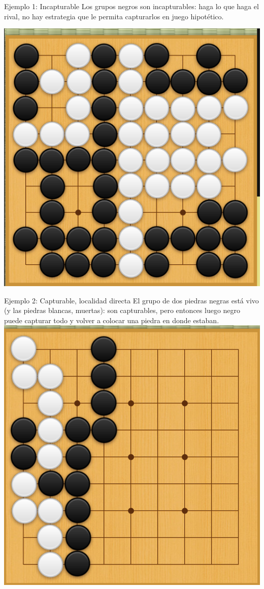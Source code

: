 \documentclass{beamer}
\begin{document}
\begin{frame}{Ejemplo 1: Incapturable}
    Los grupos negros son incapturables: haga lo que haga el rival, no hay estrategia que le permita capturarlos en juego hipotético.
    
    \includegraphics[scale=0.3]{incapturable.png}
    
\end{frame}

\begin{frame}{Ejemplo 2: Capturable, localidad directa}
    El grupo de dos piedras negras está vivo (y las piedras blancas, muertas): son capturables, pero entonces luego negro puede capturar todo y volver a colocar una piedra en donde estaban.
    \includegraphics[scale=0.3]{capturable1.png}
\end{frame}
\end{document}
